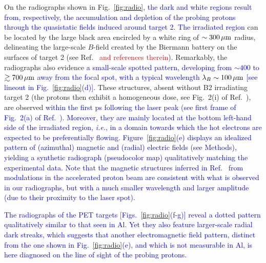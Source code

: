 \documentclass[aps,twocolumn,showpacs,superscriptaddress]{revtex4}
\begin{document}
On the radiographs shown in Fig.~\ref{fig:radio}, \textcolor{blue}{the dark and white regions result from, respectively, the accumulation and depletion of the probing protons through the quasistatic fields induced around target 2. The irradiated region} can be located by the large black area encircled by a white ring of $\sim 300\,\rm \mu m$ radius, delineating the large-scale $B$-field created by the Biermann battery on the surfaces of target 2 (see Ref.~\cite{RSI_Albertazzi_2015} \textcolor{red}{and references therein}). Remarkably, the radiographs also evidence \textcolor{blue}{a small-scale spotted pattern, developing from $\sim 400$ to $\gtrsim 700\,\rm \mu m$ away from the focal spot, with a typical wavelength  $\lambda_B \sim 100\,\rm \mu m$ [see lineout in Fig.~\ref{fig:radio}(d)].}
These structures, absent without B2 irradiating target 2 (the protons then exhibit a homogeneous dose, see Fig.~2(i) of Ref.~\cite{RSI_Albertazzi_2015}), are observed \textcolor{blue}{within the first ps following the laser peak (see first frame of Fig.~2(a) of Ref.~\cite{RSI_Albertazzi_2015})}.
\textcolor{blue}{Moreover, they are mainly located at the bottom left-hand side of the irradiated region, \emph{i.e.}, in a domain towards which the hot electrons are expected to be preferentially flowing. Figure~\ref{fig:radio}(e) displays an idealized pattern of (azimuthal) magnetic and (radial) electric fields (see Methods), yielding a synthetic radiograph (pseudocolor map) qualitatively matching the experimental data. Note that the magnetic structures inferred in Ref.~\cite{PRL_Gode_2017} from modulations in the accelerated proton beam are consistent with what is observed in our radiographs, but with a much smaller wavelength and larger amplitude (due to their proximity to the laser spot).}

\textcolor{blue}{The radiographs of the PET targets [Figs.~\ref{fig:radio}(f-g)] reveal a dotted pattern qualitatively similar to that seen in Al. Yet they also
feature larger-scale radial dark streaks, which suggests that another electromagnetic field pattern, distinct from the one shown in Fig.~\ref{fig:radio}(e), and which is not measurable in Al, is here diagnosed on the line of sight of the probing protons.}
\end{document}
